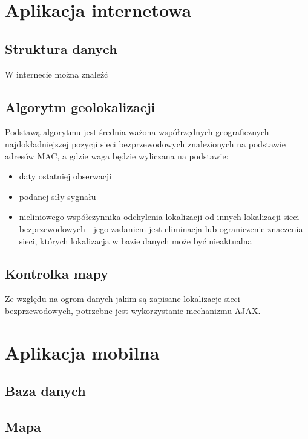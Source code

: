 \section{Aplikacja internetowa}

\subsection{Struktura danych}
W internecie można znaleźć

\subsection{Algorytm geolokalizacji}
Podstawą algorytmu jest średnia ważona współrzędnych geograficznych najdokładniejszej pozycji sieci bezprzewodowych znalezionych na podstawie adresów MAC, a gdzie waga będzie wyliczana na podstawie: 

\begin{itemize}
\item daty ostatniej obserwacji
\item podanej siły sygnału
\item nieliniowego współczynnika odchylenia lokalizacji od innych lokalizacji sieci bezprzewodowych - jego zadaniem jest eliminacja lub ograniczenie znaczenia sieci, których lokalizacja w bazie danych może być nieaktualna
\end{itemize}


\subsection{Kontrolka mapy}
Ze względu na ogrom danych jakim są zapisane lokalizacje sieci bezprzewodowych, potrzebne jest wykorzystanie mechanizmu AJAX. 

\section{Aplikacja mobilna}
\subsection{Baza danych}
\subsection{Mapa}
